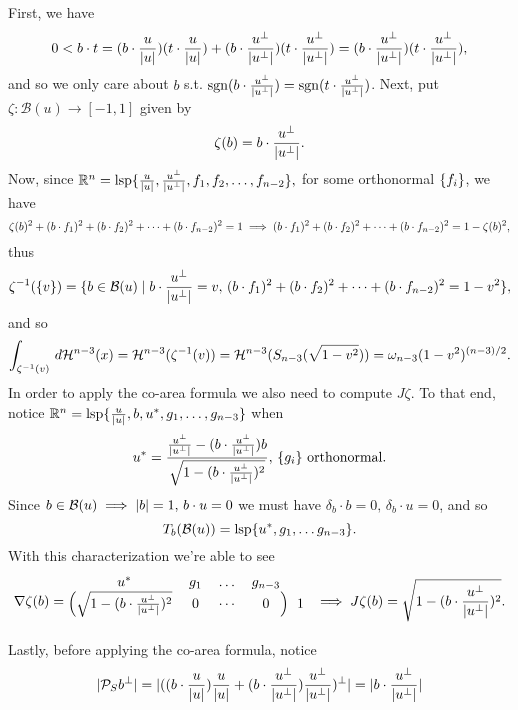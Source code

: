 \documentclass{article}
\newcommand{\sproj}{\mathcal{P}_S}
\newcommand{\lsp}[1]{\mathrm{lsp}\braces{#1}}
\newcommand{\haus}[2]{\mathcal{H}^{#1}\parens{#2}}
\begin{document}
First, we have
$$
0 < b \cdot t = (b \cdot \frac{u}{\lvert u\rvert}) (t \cdot \frac{u}{\lvert u\rvert}) + (b \cdot \frac{u^\perp}{\lvert u^\perp\rvert}) (t \cdot \frac{u^\perp}{\lvert u^\perp\rvert}) = (b \cdot \frac{u^\perp}{\lvert u^\perp\rvert}) (t \cdot \frac{u^\perp}{\lvert u^\perp\rvert}),
$$
and so we only care about $b$ s.t. $\mathrm{sgn} (b \cdot \frac{u^\perp}{\lvert u^\perp\rvert}) = \mathrm{sgn} ( t \cdot \frac{u^\perp}{\lvert u^\perp\rvert} )$. Next, put $\zeta : \mathcal{B}(u) \to [-1, 1]$ given by
$$
  \zeta(b) = b \cdot \frac{u^\perp}{\lvert u^\perp\rvert}.
$$
Now, since
$
\mathbb{R}^n = \lsp{\frac{u}{\abs{u}}, \frac{u^\perp}{\abs{u^\perp}}, f_1, f_2, \ldots, f_{n-2}},
$
for some orthonormal $\{f_i\}$, we have
$$
  \zeta(b)^2 + (b \cdot f_1)^2 + (b \cdot f_2)^2 + \cdots + (b \cdot f_{n-2})^2 = 1 \implies (b \cdot f_1)^2 + (b \cdot f_2)^2 + \cdots + (b \cdot f_{n-2})^2 = 1 - \zeta(b)^2,
$$
thus
$$
\zeta^{-1}(\{v\}) = \{ b \in \mathcal{B}(u) \mid b \cdot \frac{u^\perp}{\lvert u^\perp\rvert} = v, \, (b \cdot f_1)^2 + (b \cdot f_2)^2 + \cdots + (b \cdot f_{n-2})^2 = 1-v^2 \},
$$
and so
$$
\int_{\zeta^{-1}(v)} \, d\haus{n-3}{x} = \haus{n-3}{\zeta^{-1}(v)} = \haus{n-3}{S_{n-3}\parens{\sqrt{1-v^2}}} = \omega_{n-3}\parens{1-v^2}^{(n-3)/2}.
$$
In order to apply the co-area formula we also need to compute $J \zeta$. To that end, notice $\mathbb{R}^n = \lsp{\frac{u}{\abs{u}}, b, u^*, g_1, \ldots, g_{n-3}}$ when
$$
u^* = \frac{\frac{u^\perp}{\lvert u^\perp\rvert} - (b \cdot \frac{u^\perp}{\lvert u^\perp\rvert}) b}{\sqrt{1-(b \cdot \frac{u^\perp}{\lvert u^\perp\rvert})^2}}, \, \{g_i\} \text{ orthonormal.}
$$
Since $b \in \mathcal{B}(u) \implies \lvert b\rvert = 1, \, b \cdot u = 0$ we must have $\delta_b \cdot b = 0, \, \delta_b \cdot u = 0$, and so
$$
T_b(\mathcal{B}(u)) = \lsp{u^*, g_1, \ldots g_{n-3}}.
$$
With this characterization we're able to see
$$
\nabla \zeta(b) =
\begin{blockarray}{ccccc}
  u^* & g_1 & \ldots & g_{n-3} \\
  \begin{block}{(cccc)c}
    \sqrt{1-\parens{b \cdot \frac{u^\perp}{\abs{u^\perp}}}^2}  & 0 & \cdots & 0 & 1 \\
  \end{block}
\end{blockarray} \implies J \zeta(b) = \sqrt{1-\parens{b \cdot \frac{u^\perp}{\abs{u^\perp}}}^2}.
$$
Lastly, before applying the co-area formula, notice
$$
\abs{\sproj b^\perp} = \abs{\parens{\parens{b \cdot \frac{u}{\abs{u}}} \frac{u}{\abs{u}} + \parens{b \cdot \frac{u^\perp}{\abs{u^\perp}}} \frac{u^\perp}{\abs{u^\perp}}}^\perp} = \abs{b \cdot \frac{u^\perp}{\abs{u^\perp}}}
$$
\end{document}
